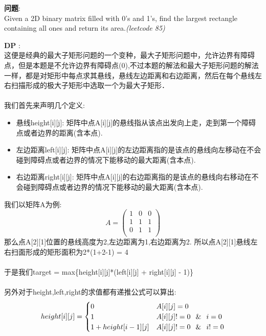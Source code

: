     
\begin{description}
    \item{\textbf{问题}}:\\
Given a 2D binary matrix filled with 0's and 1's, find the largest rectangle containing all ones and return its area.\textit{(leetcode 85)}\\
    \item{\textbf{DP}} : 
    \\这便是经典的最大子矩形问题的一个变种，最大子矩形问题中，允许边界有障碍点，但是本题是不允许边界有障碍点(0),不过本题的解法和最大子矩形问题的解法一样，都是对矩形中每点求其悬线，悬线左边距离和右边距离，然后在每个悬线左右扫描形成的极大子矩形中选取一个为最大子矩形．\\
	\\我们首先来声明几个定义:\\
\begin{itemize}
	\item{悬线height[i][j]}: 矩阵中点A[i][j]的悬线指从该点出发向上走，走到第一个障碍点或者边界的距离(含本点).
	\item{左边距离left[i][j]}: 矩阵中点A[i][j]的左边距离指的是该点的悬线向左移动在不会碰到障碍点或者边界的情况下能移动的最大距离(含本点).
	\item{右边距离right[i][j]}: 矩阵中点A[i][j]的右边距离指的是该点的悬线向右移动在不会碰到障碍点或者边界的情况下能移动的最大距离(含本点).
\end{itemize}
	我们以矩阵A为例:\\
$$
A=\begin{pmatrix}
1 & 0 & 0 \\
1 & 1 & 1 \\
0 & 1 & 1 \\
\end{pmatrix}
$$
那么点A[2][1]位置的悬线高度为2,左边距离为1,右边距离为2. 所以点A[2][1]悬线左右扫面形成的矩形面积为2*(1+2-1) = 4\\
	\\于是我们target = max\{height[i][j]*(left[i][j] + right[i][j] - 1)\}\\
	\\另外对于height,left,right的求值都有递推公式可以算出:\\
$$
height[i][j] =
\begin{cases} 
0 & A[i][j] = 0  \\
1 & A[i][j] != 0 \,\And\, i = 0 \\
1 + height[i-1][j] & A[i][j] != 0 \,\And\, i != 0 \\

\end{cases}$$
\end{description}
